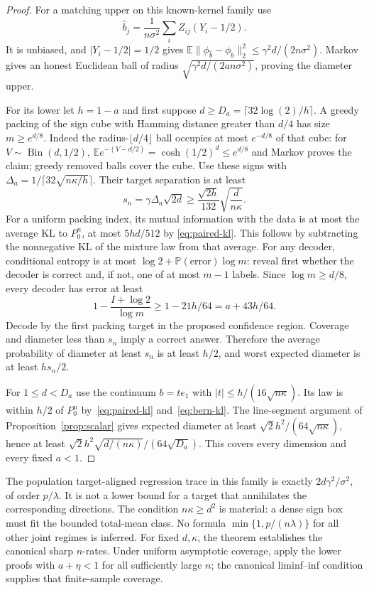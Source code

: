 \documentclass[11pt,a4paper]{article}
\numberwithin{equation}{section}
\theoremstyle{definition}
\newcommand{\E}{\mathbb E}
\newcommand{\Prb}{\mathbb P}
\begin{document}
\begin{proof}
For a matching upper on this known-kernel family use
\[
 \widehat b_j=\frac1{n\sigma^2}\sum_iZ_{ij}(Y_i-1/2).
\]
It is unbiased, and $|Y_i-1/2|=1/2$ gives
$\E\|\phi_{\widehat b}-\phi_b\|_2^2\le
\gamma^2d/(2n\sigma^2)$. Markov gives an honest Euclidean ball of
radius $\sqrt{\gamma^2d/(2an\sigma^2)}$, proving the diameter upper.

For its lower let $h=1-a$ and first suppose
$d\ge D_a=\lceil32\log(2)/h\rceil$. A greedy packing of the sign cube
with Hamming distance greater than $d/4$ has size $m\ge e^{d/8}$.
Indeed the radius-$\lfloor d/4\rfloor$ ball occupies at most $e^{-d/8}$
of that cube: for $V\sim\operatorname{Bin}(d,1/2)$,
$\E e^{-(V-d/2)}=\cosh(1/2)^d\le e^{d/8}$ and Markov proves the
claim; greedy removed balls cover the cube. Use these signs with
$\Delta_a=1/\lceil32\sqrt{n\kappa/h}\rceil$.
Their target separation is at least
\[
 s_n=\gamma\Delta_a\sqrt{2d}
       \ge\frac{\sqrt{2h}}{132}\sqrt{\frac d{n\kappa}}.
\]
For a uniform packing index, its mutual information with the data is
at most the average KL to $P_0^n$, at most $5hd/512$ by
\eqref{eq:paired-kl}. This follows by subtracting the nonnegative
KL of the mixture law from that average. For any decoder, conditional
entropy is at most $\log2+\Prb(\text{error})\log m$: reveal first
whether the decoder is correct and, if not, one of at most $m-1$ labels.
Since $\log m\ge d/8$, every decoder has error at least
\[
 1-\frac{I+\log2}{\log m}\ge1-21h/64=a+43h/64.
\]
Decode by the first packing target in the proposed confidence region.
Coverage and diameter less than $s_n$ imply a correct answer. Therefore
the average probability of diameter at least $s_n$ is at least $h/2$,
and worst expected diameter is at least $hs_n/2$.

For $1\le d<D_a$ use the continuum $b=t e_1$ with
$|t|\le h/(16\sqrt{n\kappa})$. Its law is within $h/2$ of $P_0^n$
by~\eqref{eq:paired-kl} and~\eqref{eq:bern-kl}. The line-segment
argument of Proposition~\ref{prop:scalar} gives expected diameter at
least $\sqrt2h^2/(64\sqrt{n\kappa})$, hence at least
$\sqrt2h^2\sqrt{d/(n\kappa)}/(64\sqrt{D_a})$.
This covers every dimension and every fixed $a<1$.
\end{proof}

The population target-aligned regression trace in this family is exactly
$2d\gamma^2/\sigma^2$, of order $p/\lambda$. It is not a lower bound
for a target that annihilates the corresponding directions. The condition
$n\kappa\ge d^2$ is material: a dense sign box must fit the bounded
total-mean class. No formula $\min\{1,p/(n\lambda)\}$ for all other
joint regimes is inferred. For fixed $d,\kappa$, the theorem establishes
the canonical sharp $n$-rates. Under uniform asymptotic coverage,
apply the lower proofs with $a+\eta<1$ for all sufficiently large $n$;
the canonical liminf--inf condition supplies that finite-sample coverage.
\end{document}
